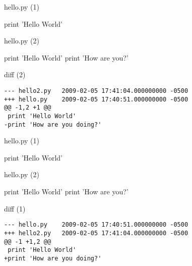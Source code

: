 \begin{frame}[fragile]

\begin{block}{hello.py (1)}
\begin{python}
print 'Hello World'
\end{python}
\end{block}

\begin{block}{hello.py (2)}
\begin{python}
print 'Hello World'
print 'How are you?'
\end{python}
\end{block}

\begin{block}{diff (2)}
\begin{verbatim}
--- hello2.py   2009-02-05 17:41:04.000000000 -0500
+++ hello.py    2009-02-05 17:40:51.000000000 -0500
@@ -1,2 +1 @@
 print 'Hello World'
-print 'How are you doing?'
\end{verbatim}
\end{block}
\end{frame}

\begin{frame}[fragile]

\begin{block}{hello.py (1)}
\begin{python}
print 'Hello World'
\end{python}
\end{block}

\begin{block}{hello.py (2)}
\begin{python}
print 'Hello World'
print 'How are you?'
\end{python}
\end{block}

\begin{block}{diff (1)}
\begin{verbatim}
--- hello.py    2009-02-05 17:40:51.000000000 -0500
+++ hello2.py   2009-02-05 17:41:04.000000000 -0500
@@ -1 +1,2 @@
 print 'Hello World'
+print 'How are you doing?'
\end{verbatim}
\end{block}

\end{frame}

